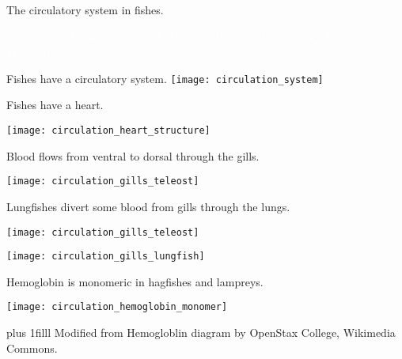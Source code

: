 \documentclass[t,handout]{beamer}  %
\begin{document}

{
\begin{frame}[b,plain]{The circulatory system in fishes.}

\hfill\parbox{3.2cm}{\raggedright\tiny\textcolor{white}{\textit{Chionodraco hamatus} (an icefish, Channichthyidae: Perciformes), Marrabbio2, Wikimedia Commons.}}

\end{frame}
}


\begin{frame}[c,plain]{Fishes have a  circulatory system.}
	\centering
	\texttt{[image: circulation\_system]}
	
\end{frame}

\begin{frame}[c,plain]{Fishes have a  heart.}

	\texttt{[image: circulation\_heart\_structure]}
	
\end{frame}

\begin{frame}[c,plain]{Blood flows from ventral to dorsal through the gills.}

	\texttt{[image: circulation\_gills\_teleost]}

	
\end{frame}

\begin{frame}[c,plain]{Lungfishes divert some blood from gills through the lungs.}

	\texttt{[image: circulation\_gills\_teleost]}

	\texttt{[image: circulation\_gills\_lungfish]}
	
\end{frame}


\begin{frame}[c,plain]{Hemoglobin is monomeric in hagfishes and lampreys.}

\vspace{\baselineskip}

	\centering
	\texttt{[image: circulation\_hemoglobin\_monomer]}

\vskip0pt plus 1filll
\hfill\tiny Modified from Hemogloblin diagram by OpenStax College, Wikimedia Commons.
\end{frame}
\end{document}
